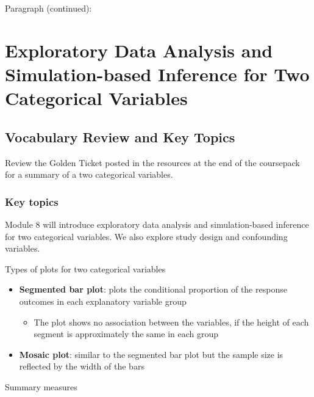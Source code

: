\documentclass[
]{report}
\providecommand{\tightlist}{%
  \setlength{\itemsep}{0pt}\setlength{\parskip}{0pt}}
\begin{document}
\newpage

Paragraph (continued):

\newpage

\chapter{Exploratory Data Analysis and Simulation-based Inference for Two Categorical Variables}\label{exploratory-data-analysis-and-simulation-based-inference-for-two-categorical-variables}

\section{Vocabulary Review and Key Topics}\label{vocabulary-review-and-key-topics-2}

Review the Golden Ticket posted in the resources at the end of the coursepack for a summary of a two categorical variables.

\subsection{Key topics}\label{key-topics-2}

Module 8 will introduce exploratory data analysis and simulation-based inference for two categorical variables. We also explore study design and confounding variables.

Types of plots for two categorical variables

\begin{itemize}
\item
  \textbf{Segmented bar plot}: plots the conditional proportion of the response outcomes in each explanatory variable group

  \begin{itemize}
  \tightlist
  \item
    The plot shows no association between the variables, if the height of each segment is approximately the same in each group
  \end{itemize}
\item
  \textbf{Mosaic plot}: similar to the segmented bar plot but the sample size is reflected by the width of the bars
\end{itemize}

Summary measures
\end{document}
